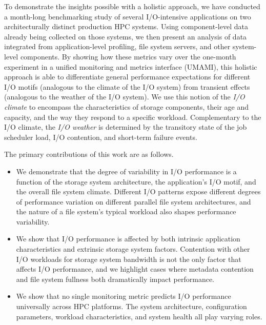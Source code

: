 To demonstrate the insights possible with a holistic approach, we have conducted a month-long benchmarking study of several I/O-intensive applications on two architecturally distinct production HPC systems.
Using component-level data already being collected on those systems, we then present an analysis of data integrated from application-level profiling, file system servers, and other system-level components.
By showing how these metrics vary over the one-month experiment in a unified monitoring and metrics interface (UMAMI), this holistic approach is able to differentiate general performance expectations for different I/O motifs (analogous to the climate of the I/O system) from transient effects (analogous to the weather of the I/O system).
We use this notion of the \emph{I/O climate} to encompass the characteristics of storage components, their age and capacity, and the way they respond to a specific workload.
Complementary to the I/O climate, the \emph{I/O weather} is determined by the transitory state of the job scheduler load, I/O contention, and short-term failure events.

The primary contributions of this work are as follows.

\begin{itemize}[leftmargin=*]

\item We demonstrate that the degree of variability in I/O performance is a function of the storage system architecture, the application's I/O motif, and the overall file system climate.
Different I/O patterns expose different degrees of performance variation on different parallel file system architectures, and the nature of a file system's typical workload also shapes performance variability.

\item We show that I/O performance is affected by both intrinsic application characteristics and extrinsic storage system factors.
Contention with other I/O workloads for storage system bandwidth is not the only factor that affects I/O performance, and
we highlight cases where metadata contention and file system fullness both dramatically impact performance.

\item We show that no single monitoring metric predicts I/O performance universally across HPC platforms.
The system architecture, configuration parameters, workload characteristics,
and system health all play varying roles.

\end{itemize}
